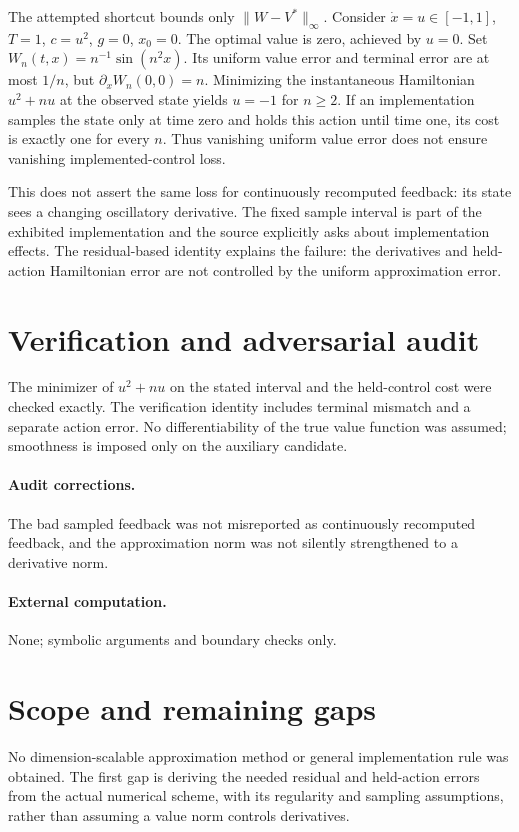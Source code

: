 \documentclass[11pt]{article}
\begin{document}
The attempted shortcut bounds only $\|W-V^*\|_\infty$. Consider
$\dot x=u\in[-1,1]$, $T=1$, $c=u^2$, $g=0$, $x_0=0$.
The optimal value is zero, achieved by $u=0$. Set
$W_n(t,x)=n^{-1}\sin(n^2x)$. Its uniform value error and terminal error are
at most $1/n$, but $\partial_xW_n(0,0)=n$. Minimizing the instantaneous
Hamiltonian $u^2+nu$ at the observed state yields $u=-1$ for $n\ge2$.
If an implementation samples the state only at time zero and holds this
action until time one, its cost is exactly one for every $n$. Thus vanishing
uniform value error does not ensure vanishing implemented-control loss.

This does not assert the same loss for continuously recomputed feedback:
its state sees a changing oscillatory derivative. The fixed sample interval
is part of the exhibited implementation and the source explicitly asks about
implementation effects. The residual-based identity explains the failure:
the derivatives and held-action Hamiltonian error are not controlled by the
uniform approximation error.
\section{Verification and adversarial audit}
The minimizer of $u^2+nu$ on the stated interval and the held-control cost
were checked exactly. The verification identity includes terminal mismatch and
a separate action error. No differentiability of the true value function was
assumed; smoothness is imposed only on the auxiliary candidate.
\paragraph{Audit corrections.} The bad sampled feedback was not misreported as continuously recomputed feedback, and the approximation norm was not silently strengthened to a derivative norm.
\paragraph{External computation.} None; symbolic arguments and boundary checks only.
\section{Scope and remaining gaps}
No dimension-scalable approximation method or general implementation rule
was obtained. The first gap is deriving the needed residual and held-action
errors from the actual numerical scheme, with its regularity and sampling
assumptions, rather than assuming a value norm controls derivatives.
\end{document}
